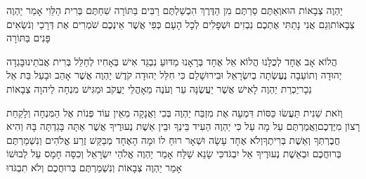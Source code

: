 \documentclass[../main/main.tex]{subfiles}
\begin{document}
\begin{multicols*}{\ncols}
יַהְוֶה צְבָאוֹת הוּא\PreVerseSpace{}וְאַתֶּם סַרְתֶּם מִן הַדֶּרֶךְ הִכְשַׁלְתֶּם רַבִּים בַּתּוֹרָה שִׁחַתֶּם בְּרִית הַלֵּוִי אָמַר יַהְוֶה צְבָאוֹת\PreVerseSpace{}וְגַם אֲנִי נָתַתִּי אֶתְכֶם נִבְזִים וּשְׁפָלִים לְכָל הָעָם כְּפִי אֲשֶׁר אֵינְכֶם שֹׁמְרִים אֶת דְּרָכַי וְנֹשְׂאִים פָּנִים בַּתּוֹרָה\OpenSection{}\par
{}הֲלוֹא אָב אֶחָד לְכֻלָּנוּ הֲלוֹא אֵל אֶחָד בְּרָאָנוּ מַדּוּעַ נִבְגַּד אִישׁ בְּאָחִיו לְחַלֵּל בְּרִית אֲבֹתֵינוּ\PreVerseSpace{}בָּגְדָה יְהוּדָה וְתוֹעֵבָה נֶעֶשְׂתָה בְיִשְׂרָאֵל וּבִירוּשָׁלֵם כִּי חִלֵּל יְהוּדָה קֹדֶשׁ יַהְוֶה אֲשֶׁר אָהֵב וּבָעַל בַּת אֵל נֵכָר\PreVerseSpace{}יַכְרֵת יַהְוֶה לָאִישׁ אֲשֶׁר יַעֲשֶׂנָּה עֵר וְעֹנֶה מֵאָהֳלֵי יַעֲקֹב וּמַגִּישׁ מִנְחָה לַיהוָה צְבָאוֹת\OpenSection{}\par
{}וְזֹאת שֵׁנִית תַּעֲשׂוּ כַּסּוֹת דִּמְעָה אֶת מִזְבַּח יַהְוֶה בְּכִי וַאֲנָקָה מֵאֵין עוֹד פְּנוֹת אֶל הַמִּנְחָה וְלָקַחַת רָצוֹן מִיֶּדְכֶם\PreVerseSpace{}וַאֲמַרְתֶּם עַל מָה עַל כִּי יַהְוֶה הֵעִיד בֵּינְךָ וּבֵין אֵשֶׁת נְעוּרֶיךָ אֲשֶׁר אַתָּה בָּגַדְתָּה בָּהּ וְהִיא חֲבֶרְתְּךָ וְאֵשֶׁת בְּרִיתֶךָ\PreVerseSpace{}וְלֹא אֶחָד עָשָׂה וּשְׁאָר רוּחַ לוֹ וּמָה הָאֶחָד מְבַקֵּשׁ זֶרַע אֱלֹהִים וְנִשְׁמַרְתֶּם בְּרוּחֲכֶם וּבְאֵשֶׁת נְעוּרֶיךָ אַל יִבְגֹּד\PreVerseSpace{}כִּי שָׂנֵא שַׁלַּח אָמַר יַהְוֶה אֱלֹהֵי יִשְׂרָאֵל וְכִסָּה חָמָס עַל לְבוּשׁוֹ אָמַר יַהְוֶה צְבָאוֹת וְנִשְׁמַרְתֶּם בְּרוּחֲכֶם וְלֹא תִבְגֹּדוּ\OpenSection{}\par

\end{multicols*}
\end{document}
